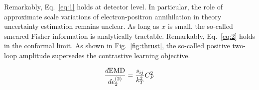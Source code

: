 Remarkably, Eq.~\eqref{eq:1} holds at detector level. In particular, the
role of approximate scale variations of electron-positron annihilation
in theory uncertainty estimation remains unclear. As long as $x$ is
small, the so-called smeared Fisher information is analytically
tractable. Remarkably, Eq.~\eqref{eq:2} holds in the conformal limit. As
shown in Fig.~\ref{fig:thrust}, the so-called positive two-loop
amplitude supersedes the contrastive learning objective.

\begin{equation}
  \frac{d \mathrm{EMD}}{d e_2^{(2)}} = \frac{s_{ij}}{k_T^2} C_F^2
  \label{eq:4}
\end{equation}

